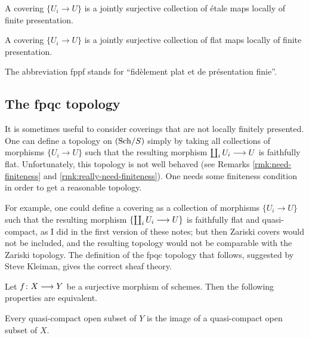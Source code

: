 \begin{2   CONTRAVARIANT FUNCTORS}
\begin{2.3 Sheaves in Grothendieck topologies}
\begin{example}
A covering $\{U_i \to U\}$ is a jointly surjective collection  of \'etale maps locally of finite presentation.
\end{example}


\begin{example}
A covering $\{U_i \to U\}$ is a jointly surjective collection of flat maps locally of finite presentation.

The  abbreviation fppf stands for ``fid\`element plat et de pr\'esentation finie''.
\end{example}




\subsection{The fpqc topology}\label{subsec:fpqc}

It is sometimes useful to consider coverings that are not locally finitely presented. One can define a topology on $({\mathrm{Sch}/S})$ simply by taking all collections of morphisms $\{U_i \to U\}$ such that the resulting morphism $\coprod_i U_i \arr U$ is faithfully flat. Unfortunately, this topology is not well behaved (see Remarks \ref{rmk:need-finiteness} and \ref{rmk:really-need-finiteness}). One needs some finiteness condition in order to get a reasonable topology. 

For example, one could define a covering as a collection of morphisms $\{U_i \to U\}$ such that the resulting morphism $\{\coprod_i U_i \arr U\}$ is faithfully flat and quasi-compact, as I did in the first version of these notes; but then Zariski covers would not be included, and the resulting topology would not be comparable with the Zariski topology. The definition of the fpqc topology that follows, suggested by Steve Kleiman, gives the correct sheaf theory.

\begin{proposition}
Let $f \colon X \arr Y$ be a surjective morphism of schemes. Then the following properties are equivalent.

\begin{enumeratei}

 Every quasi-compact open subset of $Y$ is the image of a quasi-compact open subset of $X$.


\end{enumeratei}
\end{proposition}
\end{2.3 Sheaves in Grothendieck topologies}
\end{2   CONTRAVARIANT FUNCTORS}
